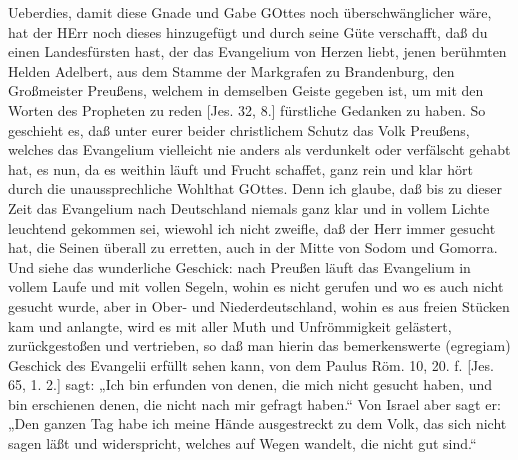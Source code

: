 Ueberdies, damit diese Gnade und Gabe GOttes noch überschwänglicher wäre, hat der HErr noch dieses hinzugefügt und durch seine Güte verschafft, daß du einen Landesfürsten hast, der das Evangelium von Herzen liebt, jenen berühmten Helden Adelbert, aus dem Stamme der Markgrafen zu Brandenburg, den Großmeister
Preußens, welchem in demselben Geiste gegeben ist, um mit den Worten des Propheten zu reden [Jes. 32, 8.] fürstliche Gedanken zu haben. So geschieht es, daß unter eurer beider christlichem Schutz das Volk Preußens, welches das Evangelium vielleicht nie anders als verdunkelt oder verfälscht gehabt hat, es nun, da es weithin läuft und Frucht schaffet, ganz rein und klar hört durch die unaussprechliche Wohlthat GOttes. Denn ich glaube, daß bis zu dieser Zeit das Evangelium nach Deutschland niemals ganz klar und in vollem Lichte leuchtend gekommen sei, wiewohl ich nicht zweifle, daß der Herr immer gesucht hat, die Seinen überall zu erretten, auch in der Mitte von Sodom und Gomorra. Und siehe das wunderliche Geschick: nach Preußen läuft das Evangelium in vollem Laufe und mit vollen Segeln, wohin es nicht gerufen und wo es auch nicht gesucht wurde, aber in Ober- und Niederdeutschland, wohin es aus freien Stücken kam und anlangte, wird es mit aller Muth und Unfrömmigkeit gelästert, zurückgestoßen und vertrieben, so daß man hierin das bemerkenswerte (egregiam) Geschick des Evangelii erfüllt sehen kann, von dem Paulus Röm. 10, 20. f. [Jes. 65, 1. 2.] sagt: „Ich bin erfunden von denen, die mich nicht gesucht haben, und bin erschienen denen, die nicht nach mir gefragt haben.“ Von Israel aber sagt er: „Den ganzen Tag habe ich meine Hände ausgestreckt zu dem Volk, das sich nicht sagen läßt und widerspricht, welches auf Wegen wandelt, die nicht gut sind.“

